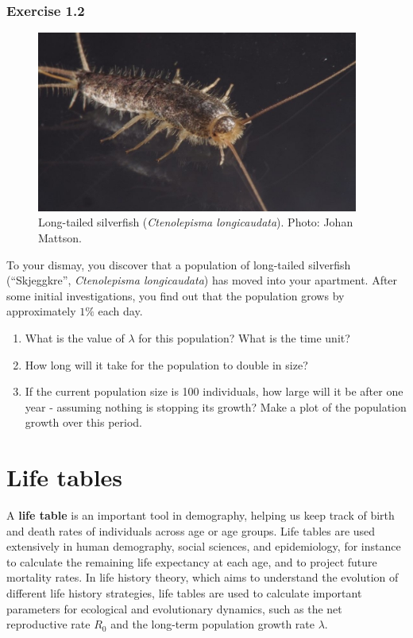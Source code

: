 \documentclass[
]{book}
\begin{document}
\hypertarget{exercise-1.2}{%
\subsection*{Exercise 1.2}\label{exercise-1.2}}

\begin{figure}
\centering
\includegraphics[width=4.16667in,height=\textheight]{skjeggkre.jpg}
\caption{Long-tailed silverfish (\emph{Ctenolepisma longicaudata}). Photo: Johan Mattson.}
\end{figure}

To your dismay, you discover that a population of long-tailed silverfish (``Skjeggkre'', \emph{Ctenolepisma longicaudata}) has moved into your apartment. After some initial investigations, you find out that the population grows by approximately \(1\%\) each day.

\begin{enumerate}
\def\labelenumi{\arabic{enumi}.}
\item
  What is the value of \(\lambda\) for this population? What is the time unit?
\item
  How long will it take for the population to double in size?
\item
  If the current population size is 100 individuals, how large will it be after one year - assuming nothing is stopping its growth? Make a plot of the population growth over this period.
\end{enumerate}

\hypertarget{s02-life-tables}{%
\chapter{Life tables}\label{s02-life-tables}}

A \textbf{life table} is an important tool in demography, helping us keep track of birth and death rates of individuals across age or age groups. Life tables are used extensively in human demography, social sciences, and epidemiology, for instance to calculate the remaining life expectancy at each age, and to project future mortality rates. In life history theory, which aims to understand the evolution of different life history strategies, life tables are used to calculate important parameters for ecological and evolutionary dynamics, such as the net reproductive rate \(R_0\) and the long-term population growth rate \(\lambda\).
\end{document}
